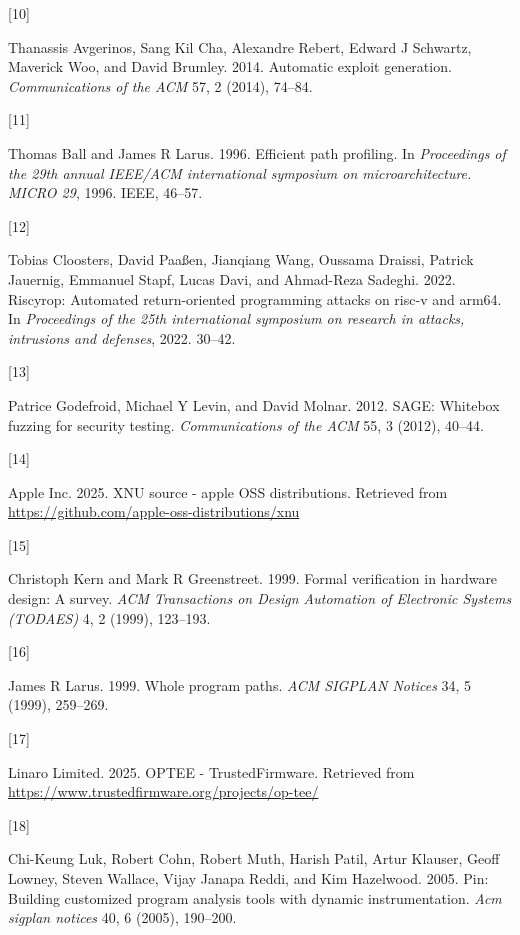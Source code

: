 \documentclass[a4paper, nobind]{templates/ociamthesis}
\newlength{\cslhangindent}
\newlength{\csllabelwidth}
\newenvironment{CSLReferences}[2] %
{\begin{list}{}{%
	\setlength{\itemindent}{0pt}
	\setlength{\leftmargin}{0pt}
	\setlength{\parsep}{0pt}
	\ifodd #1
	\setlength{\leftmargin}{\cslhangindent}
	\setlength{\itemindent}{-1\cslhangindent}
	\fi
	\setlength{\itemsep}{#2\baselineskip}}}
{\end{list}}
\newcommand{\CSLLeftMargin}[1]{\parbox[t]{\csllabelwidth}{\strut#1\strut}}
\newcommand{\CSLRightInline}[1]{\parbox[t]{\linewidth - \csllabelwidth}{\strut#1\strut}}
\begin{document}
\begin{CSLReferences}{0}{0}
\CSLLeftMargin{{[}10{]} }%
\CSLRightInline{Thanassis Avgerinos, Sang Kil Cha, Alexandre Rebert, Edward J Schwartz, Maverick Woo, and David Brumley. 2014. Automatic exploit generation. \emph{Communications of the ACM} 57, 2 (2014), 74--84.}

\CSLLeftMargin{{[}11{]} }%
\CSLRightInline{Thomas Ball and James R Larus. 1996. Efficient path profiling. In \emph{Proceedings of the 29th annual IEEE/ACM international symposium on microarchitecture. MICRO 29}, 1996. IEEE, 46--57.}

\CSLLeftMargin{{[}12{]} }%
\CSLRightInline{Tobias Cloosters, David Paaßen, Jianqiang Wang, Oussama Draissi, Patrick Jauernig, Emmanuel Stapf, Lucas Davi, and Ahmad-Reza Sadeghi. 2022. Riscyrop: Automated return-oriented programming attacks on risc-v and arm64. In \emph{Proceedings of the 25th international symposium on research in attacks, intrusions and defenses}, 2022. 30--42.}

\CSLLeftMargin{{[}13{]} }%
\CSLRightInline{Patrice Godefroid, Michael Y Levin, and David Molnar. 2012. SAGE: Whitebox fuzzing for security testing. \emph{Communications of the ACM} 55, 3 (2012), 40--44.}

\CSLLeftMargin{{[}14{]} }%
\CSLRightInline{Apple Inc. 2025. XNU source - apple OSS distributions. Retrieved from \url{https://github.com/apple-oss-distributions/xnu}}

\CSLLeftMargin{{[}15{]} }%
\CSLRightInline{Christoph Kern and Mark R Greenstreet. 1999. Formal verification in hardware design: A survey. \emph{ACM Transactions on Design Automation of Electronic Systems (TODAES)} 4, 2 (1999), 123--193.}

\CSLLeftMargin{{[}16{]} }%
\CSLRightInline{James R Larus. 1999. Whole program paths. \emph{ACM SIGPLAN Notices} 34, 5 (1999), 259--269.}

\CSLLeftMargin{{[}17{]} }%
\CSLRightInline{Linaro Limited. 2025. OPTEE - TrustedFirmware. Retrieved from \url{https://www.trustedfirmware.org/projects/op-tee/}}

\CSLLeftMargin{{[}18{]} }%
\CSLRightInline{Chi-Keung Luk, Robert Cohn, Robert Muth, Harish Patil, Artur Klauser, Geoff Lowney, Steven Wallace, Vijay Janapa Reddi, and Kim Hazelwood. 2005. Pin: Building customized program analysis tools with dynamic instrumentation. \emph{Acm sigplan notices} 40, 6 (2005), 190--200.}


\end{CSLReferences}
\end{document}
